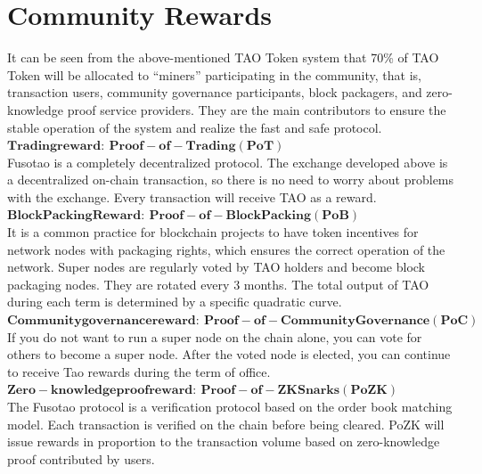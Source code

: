 \documentclass[a4paper,12pt]{article}
\begin{document}
\section{Community Rewards}
\label{sec:4}
It can be seen from the above-mentioned TAO Token system that 70\% of TAO Token will be allocated to “miners” participating in the community, that is, transaction users, community governance participants, block packagers, and zero-knowledge proof service providers. They are the main contributors to ensure the stable operation of the system and realize the fast and safe protocol.\\
$\operatorname{\mathbf{Trading reward:\ Proof-of-Trading (PoT)}}$\\
Fusotao is a completely decentralized protocol. The exchange developed above is a decentralized on-chain transaction, so there is no need to worry about problems with the exchange. Every transaction will receive TAO as a reward.\\
$\operatorname{\mathbf{Block Packing Reward:\ Proof-of-Block Packing (PoB)}}$\\
It is a common practice for blockchain projects to have token incentives for network nodes with packaging rights, which ensures the correct operation of the network. Super nodes are regularly voted by TAO holders and become block packaging nodes. They are rotated every 3 months. The total output of TAO during each term is determined by a specific quadratic curve.\\
$\operatorname{\mathbf{Community governance reward:\ Proof-of-Community Governance (PoC)}}$\\
If you do not want to run a super node on the chain alone, you can vote for others to become a super node. After the voted node is elected, you can continue to receive Tao rewards during the term of office.\\
$\operatorname{\mathbf{Zero-knowledge proof reward:\ Proof-of-ZK Snarks (PoZK)}}$\\
The Fusotao protocol is a verification protocol based on the order book matching model. Each transaction is verified on the chain before being cleared. PoZK will issue rewards in proportion to the transaction volume based on zero-knowledge proof contributed by users.\\
\end{document}
